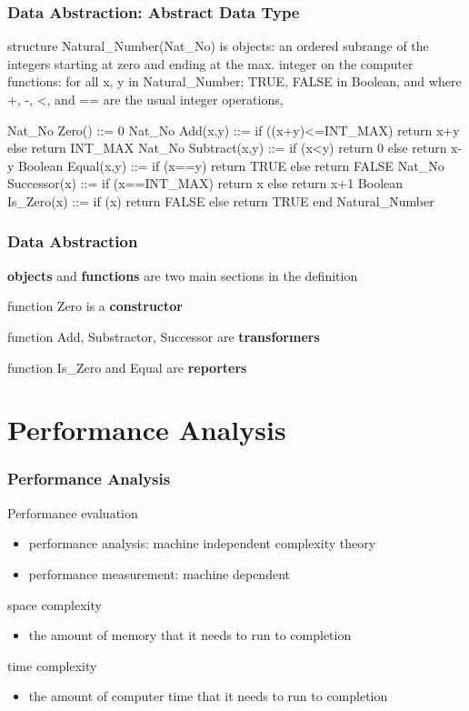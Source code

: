 \documentclass[newPxFont,sthlmFooter,nooffset]{beamer}
\begin{document}
\begin{frame}[t, fragile]
  \frametitle{Data Abstraction: Abstract Data Type}
\begin{codedefnb}
structure Natural_Number(Nat_No) is
   objects: an ordered subrange of the integers 
            starting at zero and ending at the max. 
            integer on the computer 
   functions: for all x, y in Natural_Number; 
            TRUE, FALSE in Boolean, 
            and where +, -, <, and == are 
            the usual integer operations,

   Nat_No Zero() ::= 0
   Nat_No Add(x,y) ::= if ((x+y)<=INT_MAX) return x+y
      else return INT_MAX 
   Nat_No Subtract(x,y) ::= if (x<y) return 0
      else return x-y 
   Boolean Equal(x,y) ::= if (x==y) return TRUE
      else return FALSE 
   Nat_No Successor(x) ::= if (x==INT_MAX) return x
      else return x+1 
   Boolean Is_Zero(x) ::= if (x) return FALSE
      else return TRUE
end Natural_Number
\end{codedefnb}
\end{frame}

\begin{frame}[t]
  \frametitle{Data Abstraction}
\textbf{objects} and \textbf{functions} are two main sections in the definition

function Zero is a \textbf{constructor} 

function Add, Substractor, Successor are \textbf{transformers}

function Is\_Zero and Equal are \textbf{reporters}
\end{frame}


\section{Performance Analysis}
\begin{frame}[t]
  \frametitle{Performance Analysis}
Performance evaluation 
\begin{itemize}
\item performance analysis: machine independent complexity theory 
\item performance measurement: machine dependent
\end{itemize}

space complexity
\begin{itemize}
\item the amount of memory that it needs to run to completion
\end{itemize}

time complexity
\begin{itemize}
\item the amount of computer time that it needs to run to completion
\end{itemize}

\end{frame}
\end{document}
